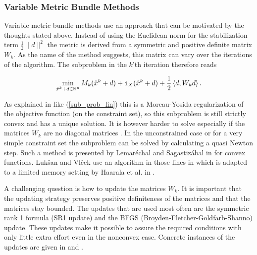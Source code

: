 
\subsubsection{Variable Metric Bundle Methods}

Variable metric bundle methods use an approach that can be motivated by the thoughts stated above.
Instead of using the Euclidean norm for the stabilization term \(\frac{1}{2}\|d\|^2 \) the metric is derived from a symmetric and positive definite matrix \(W_k\). As the name of the method suggests, this matrix can vary over the iterations of the algorithm. The subproblem in the \(k\)'th iteration therefore reads 

\begin{equation*}
	\min_{\hat{x}^k+d \in \mathbb{R}^n} M_k(\hat{x}^k+d)+\mathtt{i}_{X}(\hat{x}^k+d)+\frac{1}{2}\left\langle d,W_kd \right\rangle.
\end{equation*}

As explained in \cite{Lemarechal1994} like (\ref{sub_prob_fin}) this is a Moreau-Yosida regularization of the objective function (on the constraint set), so this subproblem is still strictly convex and has a unique solution. It is however harder to solve especially if the matrices \(W_k\) are no diagonal matrices \cite{Luksan1999}.
In the unconstrained case or for a very simple constraint set the subproblem can be solved by calculating a quasi Newton step. Such a method is presented by Lemar\'{e}chal and Sagastiz\'{a}bal in \cite{Lemarechal1997} for convex functions. Luk\v{s}an and {Vl\v{c}ek} use an algorithm in those lines in \cite{Vlcek2001} which is adapted to a limited memory setting by Haarala et al. in \cite{Haarala2007}.

A challenging question is how to update the matrices \(W_k\). It is important that the updating strategy preserves positive definiteness of the matrices and that the matrices stay bounded. The updates that are used most often are the symmetric rank 1 formula (SR1 update) and the BFGS (Broyden-Fletcher-Goldfarb-Shanno) update. These updates make it possible to assure the required conditions with only little extra effort even in the nonconvex case. Concrete instances of the updates are given in \cite{Vlcek2001} and \cite{Lemarechal1994}.

